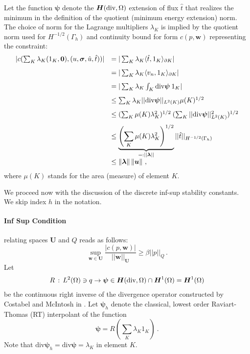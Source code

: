 \documentclass[letterpaper]{article}
\newcommand{\norm}[1]{\left\| #1 \right\|}
\newcommand{\ptl}{{\partial}}
\newcommand{\bfsig}{\mbox{\boldmath $\sigma$}}
\newcommand{\bfu}{\boldsymbol u}
\newcommand{\bfU}{\boldsymbol U}
\newcommand{\bfw}{\boldsymbol w}
\newcommand{\bfpsi}{\boldsymbol\psi}
\newcommand{\bflambda}{\boldsymbol\lambda}
\newcommand{\bfH}{\mbox{\boldmath $H$}}
\begin{document}
Let the function $\bfpsi$ denote the $\bfH(\text{div},\Omega)$ extension of flux $\hat{t}$
that realizes the minimum in the definition of the quotient (minimum energy
extension) norm.
The choice of norm for the Lagrange multipliers $\lambda_K$ is implied
by the quotient norm used for $H^{-1/2}(\Gamma_h)$ and continuity
bound for form $c(p,\bfw)$ representing the constraint:
\begin{equation}
\begin{array}{lll}
| c(\sum_K \lambda_K (1_K,{\bf 0}),(u,\bfsig,\hat{u},\hat{t})) |
& = | \sum_K \lambda_K \langle \hat{t}, 1_K \rangle_{\ptl K} | \\[8pt]
& = | \sum_K \lambda_K \langle v_n , 1_K \rangle_{\ptl K} | \\[8pt]
& = | \sum_K \lambda_K \int_K \text{div} \bfpsi \: 1_K  | \\[8pt]
& \leq \sum_K  \lambda_K || \text{div} \bfpsi ||_{L^2(K)} \mu(K)^{1/2} \\[8pt]
& \leq (\sum_K \mu(K) \lambda_K^2)^{1/2} \: (\sum_K || \text{div} \bfpsi ||_{L^2(K)}^2 )^{1/2} \\[8pt]
& \leq \underbrace{\left(\sum_K \mu(K) \lambda_K^2\right)^{1/2}}_{=: || \bflambda ||} ||
\hat{t} ||_{H^{-1/2}(\Gamma_h)}\\[8pt]
& \leq \norm{\bflambda}\norm{\bfu}
\,,
\end{array}
\end{equation}
where $\mu(K)$ stands for the area (measure) of element $K$.

We proceed now with the discussion of the discrete inf-sup stability constants. We skip
index $h$ in the notation.

\paragraph{Inf Sup Condition} relating spaces $\bfU$ and $Q$ reads as follows:
\begin{equation}
   \sup_{\bfw \in \bfU} \frac{| c(p,\bfw) |}{|| \bfw ||_{\bfU}} \geq \beta ||
   p ||_Q\,.
\end{equation}
Let
\begin{equation}
R\, : \, L^2(\Omega) \ni q \to \bfpsi \in \bfH(\text{div},\Omega) \cap \bfH^1(\Omega)
=\bfH^1(\Omega)
\end{equation}
be
the continuous right inverse of the divergence operator constructed by
Costabel and McIntosh in \cite{CostabelMcIntosh}.
Let $\bfpsi_h$ denote the classical, lowest order Raviart-Thomas (RT) interpolant of
the function
\begin{equation}
\bfpsi = R (\sum_K \lambda_K 1_K) \: .
\end{equation}
Note that $\text{div} \bfpsi_h = \text{div} \bfpsi = \lambda_K$ in element $K$.
\end{document}
